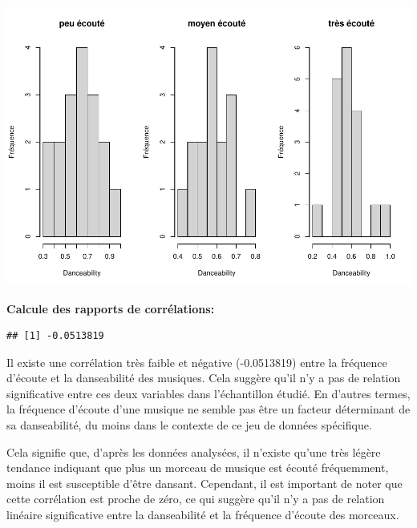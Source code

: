 \documentclass[
]{article}
\newenvironment{Shaded}{\begin{snugshade}}{\end{snugshade}}
\newcommand{\AttributeTok}[1]{\textcolor[rgb]{0.77,0.63,0.00}{#1}}
\newcommand{\FunctionTok}[1]{\textcolor[rgb]{0.00,0.00,0.00}{#1}}
\newcommand{\NormalTok}[1]{#1}
\newcommand{\OtherTok}[1]{\textcolor[rgb]{0.56,0.35,0.01}{#1}}
\newcommand{\SpecialCharTok}[1]{\textcolor[rgb]{0.00,0.00,0.00}{#1}}
\newcommand{\StringTok}[1]{\textcolor[rgb]{0.31,0.60,0.02}{#1}}
\begin{document}
\includegraphics{spotify_analysis_files/figure-latex/unnamed-chunk-11-1.pdf}

\textbf{Calcule des rapports de corrélations:}

\begin{Shaded}
\end{Shaded}

\begin{verbatim}
## [1] -0.0513819
\end{verbatim}

Il existe une corrélation très faible et négative (-0.0513819) entre la
fréquence d'écoute et la danseabilité des musiques. Cela suggère qu'il
n'y a pas de relation significative entre ces deux variables dans
l'échantillon étudié. En d'autres termes, la fréquence d'écoute d'une
musique ne semble pas être un facteur déterminant de sa danseabilité, du
moins dans le contexte de ce jeu de données spécifique.

Cela signifie que, d'après les données analysées, il n'existe qu'une
très légère tendance indiquant que plus un morceau de musique est écouté
fréquemment, moins il est susceptible d'être dansant. Cependant, il est
important de noter que cette corrélation est proche de zéro, ce qui
suggère qu'il n'y a pas de relation linéaire significative entre la
danseabilité et la fréquence d'écoute des morceaux.
\end{document}
